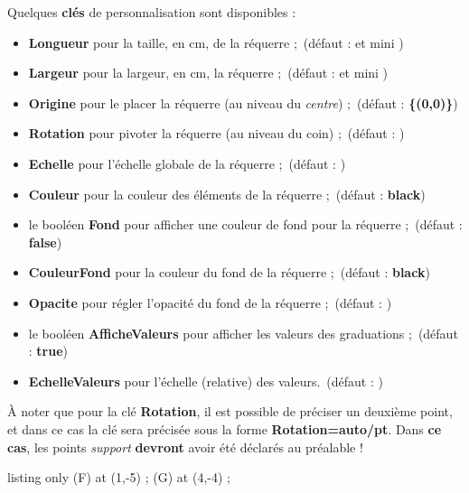 \documentclass[french,a4paper,11pt]{article}
\newcommand\Cle[1]{{\bfseries\sffamily\textlangle #1\textrangle}}
\begin{document}
\begin{tipblock}
Quelques \Cle{clés} de personnalisation sont disponibles :

\begin{itemize}
	\item \Cle{Longueur} pour la taille, en cm, de la réquerre ;\hfill~(défaut : \Cle{12} et mini \Cle{6})
	\item \Cle{Largeur} pour la largeur, en cm, la réquerre ;\hfill~(défaut : \Cle{3} et mini \Cle{1.5})
	\item \Cle{Origine} pour le placer la réquerre (au niveau du \textit{centre}) ;\hfill~(défaut : \Cle{\{(0,0)\}})
	\item \Cle{Rotation} pour pivoter la réquerre (au niveau du coin) ;\hfill~(défaut : \Cle{0})
	\item \Cle{Echelle} pour l'échelle globale de la réquerre ;\hfill~(défaut : \Cle{1})
	\item \Cle{Couleur} pour la couleur des éléments de la réquerre ;\hfill~(défaut : \Cle{black})
	\item le booléen \Cle{Fond} pour afficher une couleur de fond pour la réquerre ;\hfill~(défaut : \Cle{false})
	\item \Cle{CouleurFond} pour la couleur du fond de la réquerre ;\hfill~(défaut : \Cle{black})
	\item \Cle{Opacite} pour régler l'opacité du fond de la réquerre ;\hfill~(défaut : \Cle{0.5})
	\item le booléen \Cle{AfficheValeurs} pour afficher les valeurs des graduations ;\hfill~(défaut : \Cle{true})
	\item \Cle{EchelleValeurs} pour l'échelle (relative) des valeurs.\hfill~(défaut : \Cle{0.8})
\end{itemize}

À noter que pour la clé \Cle{Rotation}, il est possible de préciser un deuxième point, et dans ce cas la clé sera précisée sous la forme \Cle{Rotation=auto/pt}. Dans \textbf{ce cas}, les points \textit{support} \textbf{devront} avoir été déclarés au préalable !
\end{tipblock}

\begin{PresentationCode}{listing only}
\coordinate (F) at (1,-5) ;
\coordinate (G) at (4,-4) ;
\tkzRequerre[Fond,CouleurFond=yellow]
\tkzRequerre[Echelle=0.5,Origine={(-5,-6)},Rotation=-80,Couleur=ForestGreen, Longueur=10,Largeur=3.5,AfficheValeurs=false]
\tkzRequerre[Origine=F,Rotation=auto/G,Couleur=DarkBlue, Longueur=9,Largeur=2.75]
\end{PresentationCode}
\end{document}
